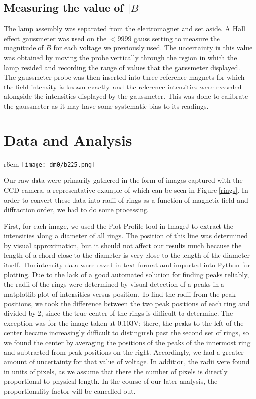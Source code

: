 \documentclass{amsart}
\begin{document}
\subsection{Measuring the value of $|B|$}
The lamp assembly was separated from the electromagnet and set aside. A Hall effect gaussmeter was used on the $<9999$ gauss setting to measure the magnitude of $B$ for each voltage we previously used. The uncertainty in this value was obtained by moving the probe vertically through the region in which the lamp resided and recording the range of values that the gaussmeter displayed. The gaussmeter probe was then inserted into three reference magnets for which the field intensity is known exactly, and the reference intensities were recorded alongside the intensities displayed by the gaussmeter. This was done to calibrate the gaussmeter as it may have some systematic bias to its readings. 
\section{Data and Analysis}
\begin{wrapfigure}{r}{6cm}
\vspace{-10pt}
\centering
\texttt{[image: dm0/b225.png]}
\caption{Image captured at 0.225V with 0.45dB gain and 5.048s exposure time}
\label{rings}
\vspace{-60pt}
\end{wrapfigure}
Our raw data were primarily gathered in the form of images captured with the CCD camera, a representative example of which can be seen in Figure \ref{rings}. In order to convert these data into radii of rings as a function of magnetic field and diffraction order, we had to do some processing. 

First, for each image, we used the Plot Profile tool in ImageJ to extract the intensities along a diameter of all rings. The position of this line was determined by visual approximation, but it should not affect our results much because the length of a chord close to the diameter is very close to the length of the diameter itself. The intensity data were saved in text format and imported into Python for plotting. Due to the lack of a good automated solution for finding peaks reliably, the radii of the rings were determined by visual detection of a peaks in a matplotlib plot of intensities versus position. To find the radii from the peak positions, we took the difference between the two peak positions of each ring and divided by $2$, since the true center of the rings is difficult to determine. The exception was for the image taken at $0.103$V: there, the peaks to the left of the center became increasingly difficult to distinguish past the second set of rings, so we found the center by averaging the positions of the peaks of the innermost ring and subtracted from peak positions on the right. Accordingly, we had a greater amount of uncertainty for that value of voltage. In addition, the radii were found in units of pixels, as we assume that there the number of pixels is directly proportional to physical length. In the course of our later analysis, the proportionality factor will be cancelled out.
\end{document}
